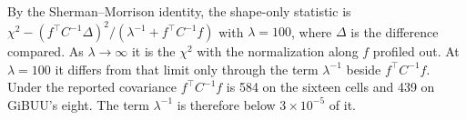 By the Sherman--Morrison identity, the shape-only statistic is $\chi^2-(f^{\top}C^{-1}\Delta)^2/(\lambda^{-1}+f^{\top}C^{-1}f)$ with $\lambda=100$, where $\Delta$ is the difference compared. As $\lambda\to\infty$ it is the $\chi^2$ with the normalization along $f$ profiled out. At $\lambda=100$ it differs from that limit only through the term $\lambda^{-1}$ beside $f^{\top}C^{-1}f$. Under the reported covariance $f^{\top}C^{-1}f$ is 584 on the sixteen cells and 439 on GiBUU's eight. The term $\lambda^{-1}$ is therefore below $3\times10^{-5}$ of it.
